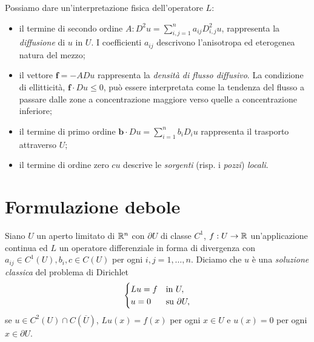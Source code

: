 \begin{osservazione}
	Possiamo dare un'interpretazione fisica dell'operatore $L$:
	\begin{itemize}
		\item il termine di secondo ordine $A : D^2 u = \sum_{i,j=1}^na_{ij}D^2_{i,j}u$, rappresenta la \emph{diffusione} di $u$ in $U$. I coefficienti $a_{ij}$ descrivono l'anisotropa ed eterogenea natura del mezzo;
		\item il vettore $\mathbf{f} = -ADu$ rappresenta la \emph{densità di flusso diffusivo}. La condizione di ellitticità, $\mathbf{f} \cdot Du \le 0$, può essere interpretata come la tendenza del flusso a passare dalle zone a concentrazione maggiore verso quelle a concentrazione inferiore;
		\item il termine di primo ordine $\mathbf{b} \cdot Du = \sum_{i=1}^n b_iD_iu$ rappresenta il trasporto attraverso $U$;
		\item il termine di ordine zero $cu$ descrive le \emph{sorgenti} (risp. i \emph{pozzi}) \emph{locali}.
	\end{itemize}
\end{osservazione}

\section{Formulazione debole}
\begin{definizione}
	Siano $U$ un aperto limitato di $\mathbb{R}^n$ con $\partial U$ di classe $C^1$, $f: U \to \mathbb{R}$ un'applicazione continua ed $L$ un operatore differenziale in forma di divergenza con $a_{ij} \in C^1(U), b_i,c \in C(U)$ per ogni $i,j=1,\dots,n$. Diciamo che $u$ è una \emph{soluzione classica} del problema di Dirichlet
	\begin{equation}
		\begin{cases}
			Lu = f & \textup{in } U,\\
			u = 0 & \textup{su } \partial U,
		\end{cases}
	\end{equation}
	se $u \in C^2(U)\cap C(\overline{U})$, $Lu(x) = f(x)$ per ogni $x \in U$ e $u(x) = 0$ per ogni $x \in \partial U$.
\end{definizione}

